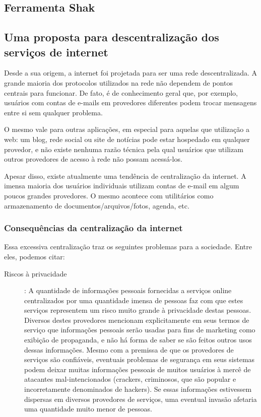 \begin{anexosenv}

\partanexos

\chapter{Ferramenta Shak }

\section{Uma proposta para descentralização dos serviços de internet}
Desde a sua origem, a internet foi projetada para ser uma rede
descentralizada. A grande maioria dos protocolos utilizados na rede não
dependem de pontos centrais para funcionar. De fato, é de conhecimento geral
que, por exemplo, usuários com contas de e-mails em provedores diferentes podem
trocar mensagens entre si sem qualquer problema.

O mesmo vale para outras aplicações, em especial para aquelas que utilização a
web: um blog, rede social ou site de notícias pode estar hospedado em
qualquer provedor, e não existe nenhuma razão técnica pela qual usuários que
utilizam outros provedores de acesso à rede não possam acessá-los.

Apesar disso, existe atualmente uma tendência de centralização da internet. A
imensa maioria dos usuários individuais utilizam contas de e-mail em algum
poucos grandes provedores. O mesmo acontece com utilitários como armazenamento
de documentos/arquivos/fotos, agenda, etc.

\subsection{Consequências da centralização da internet}

Essa excessiva centralização traz os seguintes problemas para a sociedade.
Entre eles, podemos citar:

\begin{description}
  \item [Riscos à privacidade]:  A quantidade de informações pessoais fornecidas 
  a serviços online
  centralizados por uma quantidade imensa de pessoas faz com que estes serviços
  representem um risco muito grande à privacidade destas pessoas. Diversos
  destes provedores mencionam explicitamente em seus termos de serviço que
  informações pessoais serão usadas para fins de marketing como exibição de
  propaganda, e não há forma de saber se são feitos outros usos dessas
  informações. Mesmo com a premissa de que os provedores de serviços são
  confiáveis, eventuais problemas de segurança em seus sistemas podem deixar
  muitas informações pessoais de muitos usuários à mercê de atacantes
  mal-intencionados (crackers, criminosos, que são popular e incorretamente
  denominados de hackers). Se essas informações estivessem dispersas em
  diversos provedores de serviços, uma eventual invasão afetaria uma quantidade
  muito menor de pessoas.


\end{description}
\end{anexosenv}
